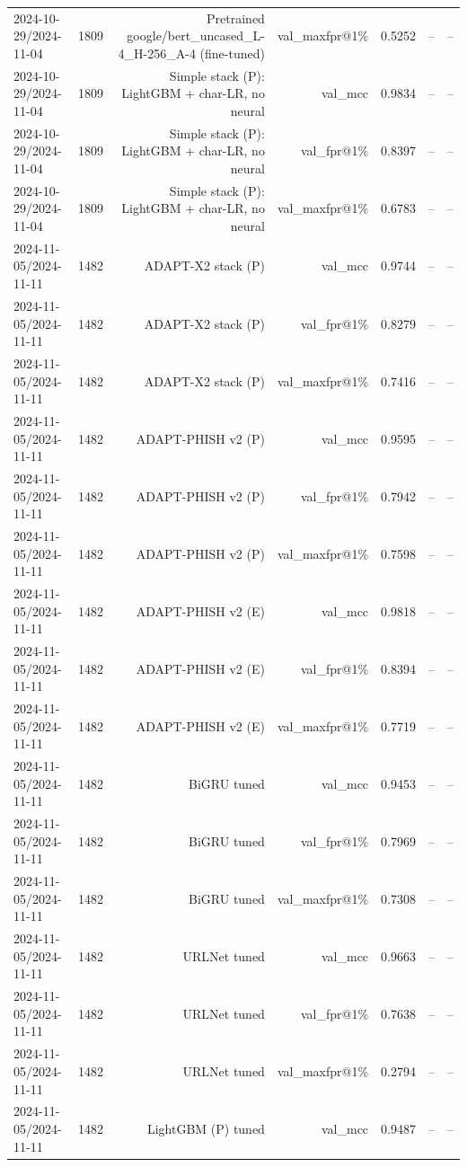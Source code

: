 \begin{table}[t]
\begin{tabular}{llrrrrr}
2024-10-29/2024-11-04 & 1809 & Pretrained google/bert\_uncased\_L-4\_H-256\_A-4 (fine-tuned) & val\_maxfpr@1\% & 0.5252 & -- & -- \\
2024-10-29/2024-11-04 & 1809 & Simple stack (P): LightGBM + char-LR, no neural & val\_mcc & 0.9834 & -- & -- \\
2024-10-29/2024-11-04 & 1809 & Simple stack (P): LightGBM + char-LR, no neural & val\_fpr@1\% & 0.8397 & -- & -- \\
2024-10-29/2024-11-04 & 1809 & Simple stack (P): LightGBM + char-LR, no neural & val\_maxfpr@1\% & 0.6783 & -- & -- \\
2024-11-05/2024-11-11 & 1482 & ADAPT-X2 stack (P) & val\_mcc & 0.9744 & -- & -- \\
2024-11-05/2024-11-11 & 1482 & ADAPT-X2 stack (P) & val\_fpr@1\% & 0.8279 & -- & -- \\
2024-11-05/2024-11-11 & 1482 & ADAPT-X2 stack (P) & val\_maxfpr@1\% & 0.7416 & -- & -- \\
2024-11-05/2024-11-11 & 1482 & ADAPT-PHISH v2 (P) & val\_mcc & 0.9595 & -- & -- \\
2024-11-05/2024-11-11 & 1482 & ADAPT-PHISH v2 (P) & val\_fpr@1\% & 0.7942 & -- & -- \\
2024-11-05/2024-11-11 & 1482 & ADAPT-PHISH v2 (P) & val\_maxfpr@1\% & 0.7598 & -- & -- \\
2024-11-05/2024-11-11 & 1482 & ADAPT-PHISH v2 (E) & val\_mcc & 0.9818 & -- & -- \\
2024-11-05/2024-11-11 & 1482 & ADAPT-PHISH v2 (E) & val\_fpr@1\% & 0.8394 & -- & -- \\
2024-11-05/2024-11-11 & 1482 & ADAPT-PHISH v2 (E) & val\_maxfpr@1\% & 0.7719 & -- & -- \\
2024-11-05/2024-11-11 & 1482 & BiGRU tuned & val\_mcc & 0.9453 & -- & -- \\
2024-11-05/2024-11-11 & 1482 & BiGRU tuned & val\_fpr@1\% & 0.7969 & -- & -- \\
2024-11-05/2024-11-11 & 1482 & BiGRU tuned & val\_maxfpr@1\% & 0.7308 & -- & -- \\
2024-11-05/2024-11-11 & 1482 & URLNet tuned & val\_mcc & 0.9663 & -- & -- \\
2024-11-05/2024-11-11 & 1482 & URLNet tuned & val\_fpr@1\% & 0.7638 & -- & -- \\
2024-11-05/2024-11-11 & 1482 & URLNet tuned & val\_maxfpr@1\% & 0.2794 & -- & -- \\
2024-11-05/2024-11-11 & 1482 & LightGBM (P) tuned & val\_mcc & 0.9487 & -- & -- \\

\end{tabular}
\end{table}
